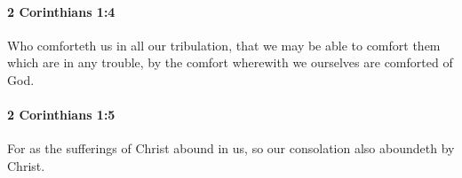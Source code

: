 		\paragraph{2 Corinthians 1:4} %
			\label{2CORINTHIANS-1-4}

			Who comforteth us in all our tribulation, that we may be able to comfort them which are in any trouble, by the comfort wherewith we ourselves are comforted of God.

			\begin{framed}
			\scriptsize
				\begin{compactdesc}
					\item[SBLG] 
				\end{compactdesc}
			\end{framed}

		\paragraph{2 Corinthians 1:5} %
			\label{2CORINTHIANS-1-5}

			For as the sufferings of Christ abound in us, so our consolation also aboundeth by Christ.

